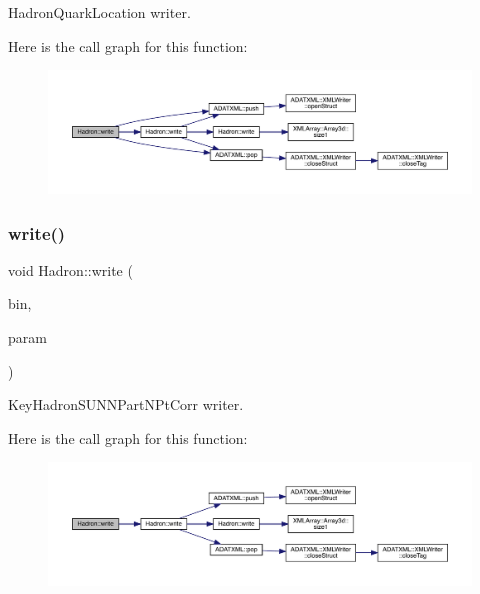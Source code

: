 Hadron\+Quark\+Location writer. 

Here is the call graph for this function\+:
\nopagebreak
\begin{figure}[H]
\begin{center}
\leavevmode
\includegraphics[width=350pt]{d1/daf/namespaceHadron_a2737e3c3e39c76c6dbe81ce5e484f6cc_cgraph}
\end{center}
\end{figure}
\mbox{\label{namespaceHadron_acd7055ec4bbdda7ceb335f7271aee72e}} 
\subsubsection{\texorpdfstring{write()}{write()}\hspace{0.1cm}{\footnotesize\ttfamily [48/95]}}
{\footnotesize\ttfamily void Hadron\+::write (\begin{DoxyParamCaption}\item[{\mbox{\hyperlink{classADATIO_1_1BinaryWriter}{Binary\+Writer}} \&}]{bin,  }\item[{const \mbox{\hyperlink{structHadron_1_1KeyHadronSUNNPartNPtCorr__t_1_1NPoint__t}{Key\+Hadron\+S\+U\+N\+N\+Part\+N\+Pt\+Corr\+\_\+t\+::\+N\+Point\+\_\+t}} \&}]{param }\end{DoxyParamCaption})}



Key\+Hadron\+S\+U\+N\+N\+Part\+N\+Pt\+Corr writer. 

Here is the call graph for this function\+:
\nopagebreak
\begin{figure}[H]
\begin{center}
\leavevmode
\includegraphics[width=350pt]{d1/daf/namespaceHadron_acd7055ec4bbdda7ceb335f7271aee72e_cgraph}
\end{center}
\end{figure}
\mbox{\label{namespaceHadron_a9309edc67ae704a831f01ae854c5bf12}} 
